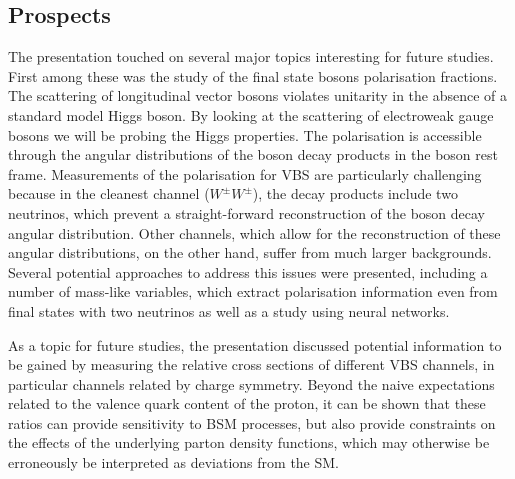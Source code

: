 \subsection{Prospects}

The presentation touched on several major topics interesting for future studies. First among these was the study of the final state bosons polarisation fractions. The scattering of longitudinal vector bosons violates unitarity in the absence of a standard model Higgs boson. By looking at the scattering of electroweak gauge bosons we will be probing the Higgs properties. %
The polarisation is accessible through the angular distributions of the boson decay products in the boson rest frame. 
Measurements of the polarisation for VBS are particularly challenging because in the cleanest channel ($W^\pm W^\pm$), the decay products include two neutrinos, which prevent a straight-forward reconstruction of the boson decay angular distribution. Other channels, which allow for the reconstruction of these angular distributions, on the other hand, suffer from much larger backgrounds. Several potential approaches to address this issues were presented, including a number of mass-like variables, which extract polarisation information even from final states with two neutrinos as well as a study using neural networks. 


As a topic for future studies, the presentation discussed potential information to be gained by measuring the relative cross sections of different VBS channels, in particular channels related by charge symmetry. Beyond the naive expectations related to the valence quark content of the proton, it can be shown that these ratios can provide sensitivity to BSM processes, but also provide constraints on the effects of the underlying parton density functions, which may otherwise be erroneously be interpreted as deviations from the SM.

